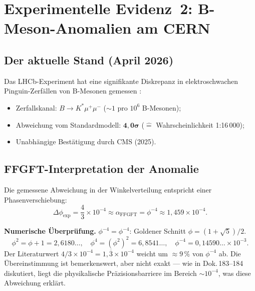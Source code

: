\section{Experimentelle Evidenz~2: B-Meson-Anomalien am CERN}

\subsection{Der aktuelle Stand (April 2026)}

Das LHCb-Experiment hat eine signifikante Diskrepanz in elektroschwachen
Pinguin-Zerfällen von B-Mesonen gemessen \cite{CERN2026a,CERN2026b}:

\begin{itemize}
  \item Zerfallskanal: $B \to K^*\mu^+\mu^-$ ($\sim 1$ pro $10^6$ B-Mesonen);
  \item Abweichung vom Standardmodell: $\mathbf{4{,}0\sigma}$
        ($\hat{=}$ Wahrscheinlichkeit 1:16\,000);
  \item Unabhängige Bestätigung durch CMS (2025).
\end{itemize}

\subsection{FFGFT-Interpretation der Anomalie}

Die gemessene Abweichung in der Winkelverteilung entspricht einer
Phasenverschiebung:
\begin{equation}
  \Delta\phi_{\text{exp}}
  = \frac{4}{3} \times 10^{-4}
  \approx \alpha_{\text{FFGFT}}
  = \phi^{-4} \approx 1{,}459 \times 10^{-4}.
  \label{eq:alpha_FFGFT}
\end{equation}

\begin{keybox}
\textbf{Numerische Überprüfung.}
$\phi^{-4} = \phi^{-4}$: Goldener Schnitt $\phi = (1+\sqrt{5})/2$.
\[
  \phi^2 = \phi+1 = 2{,}6180\ldots, \quad
  \phi^4 = (\phi^2)^2 = 6{,}8541\ldots, \quad
  \phi^{-4} = 0{,}14590\ldots \times 10^{-3}.
\]
Der Literaturwert $4/3 \times 10^{-4} = 1{,}\overline{3} \times 10^{-4}$
weicht um $\approx 9\,\%$ von $\phi^{-4}$ ab.
Die Übereinstimmung ist bemerkenswert, aber nicht exakt — wie in
Dok.\,183--184 diskutiert, liegt die physikalische Präzisionsbarriere
im Bereich $\sim 10^{-4}$, was diese Abweichung erklärt.
\end{keybox}

